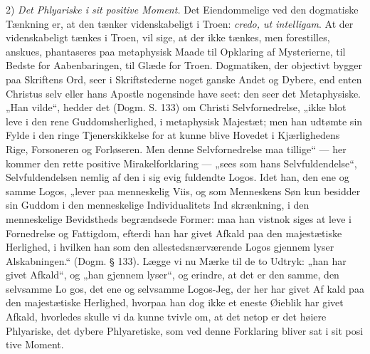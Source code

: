 \documentclass[12pt]{book}
\newcommand{\opage}[1]{\marginnote{\footnotesize\textit{[#1]}}}
\begin{document}
2) \emph{Det Phlyariske i sit positive Moment.} Det
Eiendommelige ved den dogmatiske Tænkning er, at den
tænker videnskabeligt i Troen: \textit{credo, ut intelligam}. At
der videnskabeligt tænkes i Troen, vil sige, at der ikke tænkes,
men forestilles, anskues, phantaseres paa metaphysisk Maade
til Opklaring af Mysterierne, til Bedste for Aabenbaringen,
til Glæde for Troen. Dogmatiken, der objectivt bygger paa
Skriftens Ord, seer i Skriftstederne noget ganske Andet og
Dybere, end enten Christus selv eller hans Apostle nogensinde
have seet: den seer det Metaphysiske. „Han vilde“, hedder
det (Dogm. S. 133) om Christi Selvfornedrelse, „ikke blot%
\opage{93}\setcounter{footnote}{0}%
leve i den rene Guddomsherlighed, i metaphysisk Majestæt;
men han udtømte sin Fylde i den ringe Tjenerskikkelse for at
kunne blive Hovedet i Kjærlighedens Rige, Forsoneren og
Forløseren. Men denne Selvfornedrelse maa tillige“ --- her
kommer den rette positive Mirakelforklaring --- „sees som
hans Selvfuldendelse“, Selvfuldendelsen nemlig af den i sig
evig fuldendte Logos. Idet han, den ene og samme Logos,
„lever paa menneskelig Viis, og som Menneskens Søn kun
besidder sin Guddom i den menneskelige Individualitets Ind\-%
skrænkning, i den menneskelige Bevidstheds begrændsede Former:
maa han vistnok siges at leve i Fornedrelse og Fattigdom,
efterdi han har givet Afkald paa den majestætiske Herlighed,
i hvilken han som den allestedsnærværende Logos gjennem\-%
lyser Alskabningen.“ (Dogm. § 133). Lægge vi nu Mærke
til de to Udtryk: „han har givet Afkald“, og „han gjennem\-%
lyser“, og erindre, at det er den samme, den selvsamme Lo\-%
gos, det ene og selvsamme Logos-Jeg, der her har givet Af\-%
kald paa den majestætiske Herlighed, hvorpaa han dog ikke et
eneste Øieblik har givet Afkald, hvorledes skulle vi da kunne
tvivle om, at det netop er det høiere Phlyariske, det dybere
Phlyaretiske, som ved denne Forklaring bliver sat i sit posi\-%
tive Moment.
\end{document}
